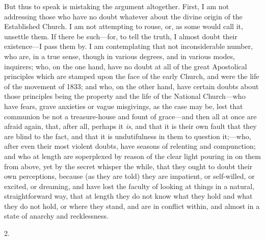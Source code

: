 But thus to speak is mistaking the argument altogether. First, I am
not addressing those who have no doubt whatever about the divine
origin of the Established Church. I am not attempting to rouse, or, as
some would call it, unsettle them. If there be such—for, to tell the
truth, I almost doubt their existence—I pass them by. I am
contemplating that not inconsiderable number, who are, in a true
sense, though in various degrees, and in various modes, inquirers;
who, on the one hand, have no doubt at all of the great Apostolical
principles which are stamped upon the face of the early Church, and
were the life of the movement of 1833; and who, on the other hand,
have certain doubts about those principles being the property and the
life of the National Church—who have fears, grave
anxieties or vague misgivings, as the case may be, lest that communion
be not a treasure-house and fount of grace—and then all at once are
afraid again, that, after all, perhaps it \emph{is}, and that it is
their own fault that they are blind to the fact, and that it is
undutifulness in them to question it;—who, after even their most
violent doubts, have seasons of relenting and compunction; and who at
length are so\textbf{}perplexed by reason of the clear light pouring in
on them from above, yet by the secret whisper the while, that they
ought to doubt their own perceptions, because (as they are told) they
are impatient, or self-willed, or excited, or dreaming, and have lost
the faculty of looking at things in a natural, straightforward way,
that at length they do not know what they hold and what they do not
hold, or where they stand, and are in conflict within, and almost in a
state of anarchy and recklessness.

2.

